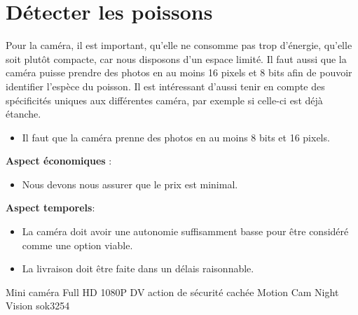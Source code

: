 \section{Détecter les poissons}
	
	Pour la caméra, il est important, qu’elle ne consomme pas trop d’énergie, qu’elle soit plutôt compacte, car nous disposons d’un espace limité. Il faut aussi que la caméra puisse prendre des photos en au moins 16 pixels et 8 bits afin de pouvoir identifier l’espèce du poisson. Il est intéressant d’aussi tenir en compte des spécificités uniques aux différentes caméra, par exemple si celle-ci est déjà étanche.
	
	\begin{itemize}
		
		\item Il faut que la caméra prenne des photos en au moins 8 bits et 16 pixels.
		
	\end{itemize}
	
	\textbf{Aspect économiques} :
	
	\begin{itemize}
		
		\item Nous devons nous assurer que le prix est minimal.
		
	\end{itemize}
	
	\textbf{Aspect temporels}:
	
	\begin{itemize}
		
		\item La caméra doit avoir une autonomie suffisamment basse pour être considéré	comme une option viable.
		
		\item La livraison doit être faite dans un délais raisonnable.
		
	\end{itemize}
	Mini caméra Full HD 1080P DV action de sécurité cachée Motion Cam Night Vision sok3254
	
